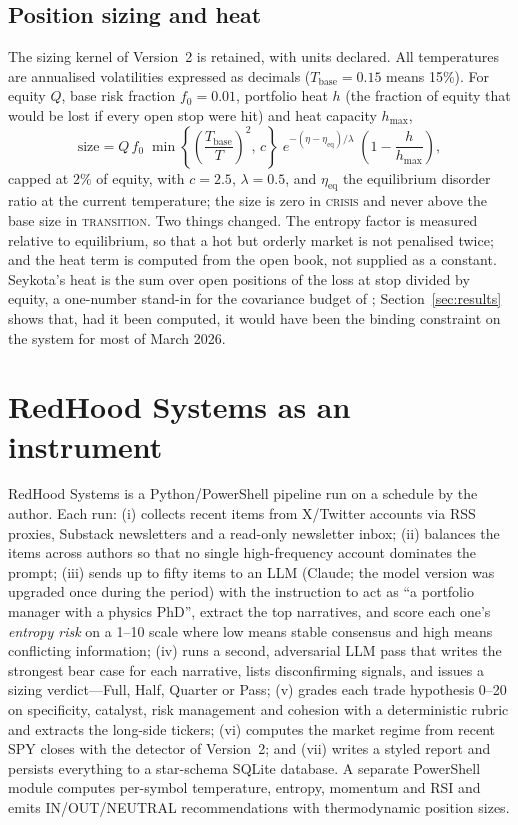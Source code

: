 \documentclass[11pt]{article}
\newcommand{\Tb}{T_{\mathrm{base}}}
\begin{document}
\subsection{Position sizing and heat}\label{sec:sizing}
The sizing kernel of Version~2 is retained, with units declared. All temperatures are annualised volatilities expressed as decimals ($\Tb=0.15$ means 15\%). For equity $Q$, base risk fraction $f_0=0.01$, portfolio heat $h$ (the fraction of equity that would be lost if every open stop were hit) and heat capacity $h_{\max}$,
\begin{equation}
\text{size}=Q\,f_0\;\min\!\left\{\left(\frac{\Tb}{T}\right)^{2},\,c\right\}\;e^{-(\eta-\eta_{\mathrm{eq}})/\lambda}\;\left(1-\frac{h}{h_{\max}}\right), \label{eq:size}
\end{equation}
capped at $2\%$ of equity, with $c=2.5$, $\lambda=0.5$, and $\eta_{\mathrm{eq}}$ the equilibrium disorder ratio at the current temperature; the size is zero in \textsc{crisis} and never above the base size in \textsc{transition}. Two things changed. The entropy factor is measured relative to equilibrium, so that a hot but orderly market is not penalised twice; and the heat term is computed from the open book, not supplied as a constant. Seykota's heat \citep{seykota1991} is the sum over open positions of the loss at stop divided by equity, a one-number stand-in for the covariance budget of \citet{markowitz1952}; Section~\ref{sec:results} shows that, had it been computed, it would have been the binding constraint on the system for most of March 2026.

\section{RedHood Systems as an instrument}\label{sec:system}
RedHood Systems is a Python/PowerShell pipeline run on a schedule by the author. Each run: (i) collects recent items from X/Twitter accounts via RSS proxies, Substack newsletters and a read-only newsletter inbox; (ii) balances the items across authors so that no single high-frequency account dominates the prompt; (iii) sends up to fifty items to an LLM (Claude; the model version was upgraded once during the period) with the instruction to act as ``a portfolio manager with a physics PhD'', extract the top narratives, and score each one's \emph{entropy risk} on a 1--10 scale where low means stable consensus and high means conflicting information; (iv) runs a second, adversarial LLM pass that writes the strongest bear case for each narrative, lists disconfirming signals, and issues a sizing verdict---Full, Half, Quarter or Pass; (v) grades each trade hypothesis 0--20 on specificity, catalyst, risk management and cohesion with a deterministic rubric and extracts the long-side tickers; (vi) computes the market regime from recent SPY closes with the detector of Version~2; and (vii) writes a styled report and persists everything to a star-schema SQLite database. A separate PowerShell module computes per-symbol temperature, entropy, momentum and RSI and emits IN/OUT/NEUTRAL recommendations with thermodynamic position sizes.
\end{document}
